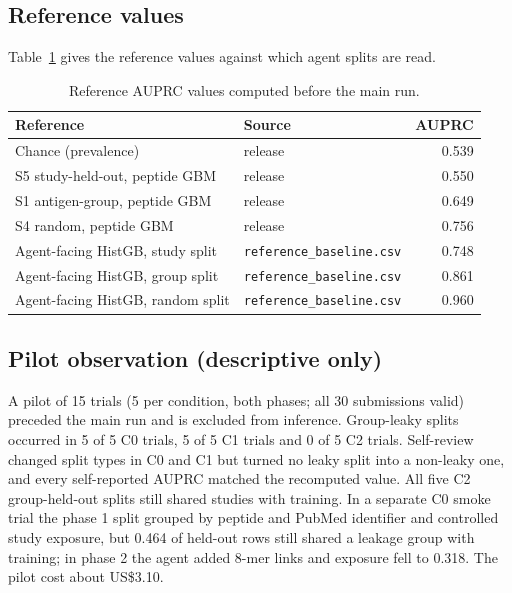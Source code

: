 \documentclass[11pt,a4paper]{article}
\begin{document}
\subsection*{Reference values}
Table~\ref{tab:reference} gives the reference values against which agent splits are read.

\begin{table}[ht]
\centering
\caption{Reference AUPRC values computed before the main run.}
\label{tab:reference}
\begin{tabular}{@{}llr@{}}
\toprule
Reference & Source & AUPRC\\
\midrule
Chance (prevalence) & release & 0.539\\
S5 study-held-out, peptide GBM & release & 0.550\\
S1 antigen-group, peptide GBM & release & 0.649\\
S4 random, peptide GBM & release & 0.756\\
Agent-facing HistGB, study split & \texttt{reference\_baseline.csv} & 0.748\\
Agent-facing HistGB, group split & \texttt{reference\_baseline.csv} & 0.861\\
Agent-facing HistGB, random split & \texttt{reference\_baseline.csv} & 0.960\\
\bottomrule
\end{tabular}
\end{table}

\subsection*{Pilot observation (descriptive only)}
A pilot of 15 trials (5 per condition, both phases; all 30 submissions valid) preceded the main run and is excluded from inference. Group-leaky splits occurred in 5 of 5 C0 trials, 5 of 5 C1 trials and 0 of 5 C2 trials. Self-review changed split types in C0 and C1 but turned no leaky split into a non-leaky one, and every self-reported AUPRC matched the recomputed value. All five C2 group-held-out splits still shared studies with training. In a separate C0 smoke trial the phase 1 split grouped by peptide and PubMed identifier and controlled study exposure, but 0.464 of held-out rows still shared a leakage group with training; in phase 2 the agent added 8-mer links and exposure fell to 0.318. The pilot cost about US\$3.10.
\end{document}
